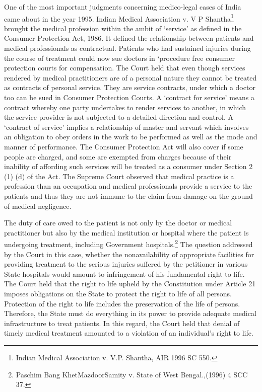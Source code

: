\begin{multicols}{2}
\noi
One of the most important judgments concerning medico-legal cases of India came about in the
year 1995. Indian Medical Association v. V P Shantha\footnote{Indian Medical Association v. V.P. Shantha, AIR 1996 SC 550.} brought the medical profession within the ambit of ‘service’ as defined in the Consumer Protection Act, 1986. It defined the relationship
between patients and medical professionals as contractual. Patients who had sustained injuries
during the course of treatment could now sue doctors in ‘procedure free consumer protection
courts for compensation. The Court held that even though services rendered by medical
practitioners are of a personal nature they cannot be treated as contracts of personal service. They are service contracts, under which a doctor too can be sued in Consumer Protection Courts. A
‘contract for service’ means a contract whereby one party undertakes to render services to another,
in which the service provider is not subjected to a detailed direction and control. A ‘contract of
service’ implies a relationship of master and servant which involves an obligation to obey orders
in the work to be performed as well as the mode and manner of performance. The Consumer
Protection Act will also cover if some people are charged, and some are exempted from charges
because of their inability of affording such services will be treated as a consumer under Section
2 (1) (d) of the Act. The Supreme Court observed that medical practice is a profession than an
occupation and medical professionals provide a service to the patients and thus they are not
immune to the claim from damage on the ground of medical negligence.

\vspace{-.12cm}


\vspace{-.12cm}

\noi
The duty of care owed to the patient is not only by the doctor or medical practitioner but also by
the medical institution or hospital where the patient is undergoing treatment, including
Government hospitals.\footnote{Paschim Bang KhetMazdoorSamity v. State of West Bengal.,(1996) 4 SCC 37.} The question addressed by the Court in this case, whether the nonavailability of appropriate facilities for providing treatment to the serious injuries suffered by the
petitioner in various State hospitals would amount to infringement of his fundamental right to
life. The Court held that the right to life upheld by the Constitution under Article 21 imposes
obligations on the State to protect the right to life of all persons. Protection of the right to life
includes the preservation of the life of persons. Therefore, the State must do everything in its
power to provide adequate medical infrastructure to treat patients. In this regard, the Court held
that denial of timely medical treatment amounted to a violation of an individual’s right to life. 


\end{multicols}
